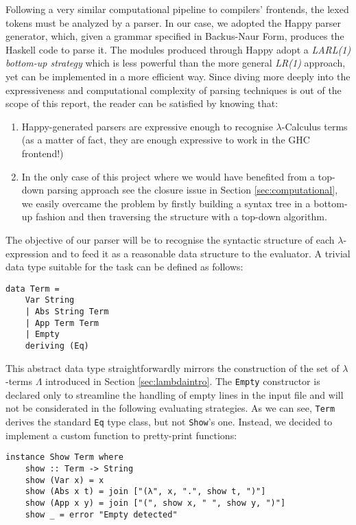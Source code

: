 \documentclass{article}
\begin{document}
Following a very similar computational pipeline to compilers' frontends, the lexed tokens must be analyzed by a parser. In our case, we adopted the Happy parser generator, which, given a grammar specified in Backus-Naur Form, produces the Haskell code to parse it. The modules produced through Happy adopt a \textit{LARL(1) bottom-up strategy} which is less powerful than the more general \textit{LR(1)} approach, yet can be implemented in a more efficient way. Since diving more deeply into the expressiveness and computational complexity of parsing techniques is out of the scope of this report, the reader can be satisfied by knowing that:

\begin{enumerate}
    \item Happy-generated parsers are expressive enough to recognise $\lambda$-Calculus terms (as a matter of fact, they are enough expressive to work in the GHC frontend!)
    \item In the only case of this project where we would have benefited from a top-down parsing approach {see the closure issue in Section \ref{sec:computational}}, we easily overcame the problem by firstly building a syntax tree in a bottom-up fashion and then traversing the structure with a top-down algorithm.
\end{enumerate}

The objective of our parser will be to recognise the syntactic structure of each $\lambda$-expression and to feed it as a reasonable data structure to the evaluator. A trivial data type suitable for the task can be defined as follows:

\begin{lstlisting}
data Term =
    Var String
    | Abs String Term
    | App Term Term
    | Empty
    deriving (Eq)
\end{lstlisting}

This abstract data type straightforwardly mirrors the construction of the set of $\lambda$-terms $\Lambda$ introduced in Section \ref{sec:lambdaintro}. The \lstinline|Empty| constructor is declared only to streamline the handling of empty lines in the input file and will not be considerated in the following evaluating strategies. As we can see, \lstinline|Term| derives the standard \lstinline|Eq| type class, but not \lstinline|Show|'s one. Instead, we decided to implement a custom function to pretty-print functions:

\begin{lstlisting}
instance Show Term where
    show :: Term -> String
    show (Var x) = x
    show (Abs x t) = join ["(λ", x, ".", show t, ")"]
    show (App x y) = join ["(", show x, " ", show y, ")"]
    show _ = error "Empty detected"
\end{lstlisting}
\end{document}

